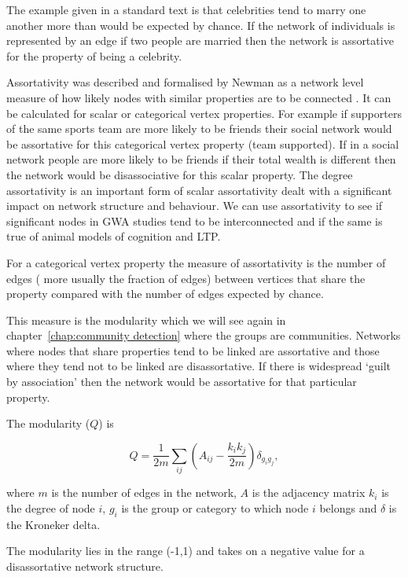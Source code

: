 The example given in a standard text is that celebrities tend to marry one another more than would be expected by chance\cite{barabasi2016network}. If the network of individuals is represented by an edge if two people are married then the network is assortative for the property of being a celebrity.

Assortativity was described and formalised by Newman as a network level measure of how likely nodes with similar properties are to be connected \cite{newman2002assortative}. It can be calculated for scalar or categorical vertex properties. For example if supporters of the same sports team are more likely to be friends their social network would be assortative for this categorical vertex property (team supported). If in a social network people are more likely to be friends if their total wealth is different then the network would be disassociative for this scalar property. The degree assortativity is an important form of scalar assortativity dealt with a significant impact on network structure and behaviour. We can use assortativity to see if significant nodes in GWA studies tend to be interconnected and if the same is true of animal models of cognition and LTP. 

For a categorical vertex property the measure of assortativity is the number of edges ( more usually the fraction of edges) between vertices that share the property compared with the number of edges expected by chance.

This measure is the modularity which we will see again in chapter~\ref{chap:community detection} where the groups are communities. Networks where nodes that share properties tend to be linked are assortative and those where they tend not to be linked are disassortative. If there is widespread `guilt by association'\cite{oliver2000guilt} then the network would be assortative for that particular property. 

The modularity ($Q$) is

\begin{equation}
    Q = \frac{1}{2m}\sum_{ij}(A_{ij}-\frac{k_ik_j}{2m})\delta_{g_ig_j},
    \label{eq:categorical assortativity}
\end{equation}

where $m$ is the number of edges in the network, $A$ is the adjacency matrix $k_i$ is the degree of node $i$, $g_i$ is the group or category to which node $i$ belongs and $\delta$ is the Kroneker delta. 

The modularity lies in the range (-1,1) and takes on a negative value for a disassortative network structure.

